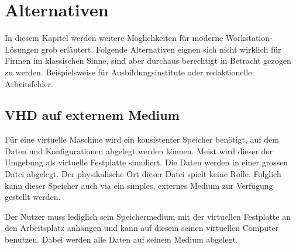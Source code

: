 




\section{Alternativen}
In diesem Kapitel werden weitere Möglichkeiten für moderne Workstation-Lösungen grob erläutert.
Folgende Alternativen eignen sich nicht wirklich für Firmen im klassischen Sinne, sind aber durchaus berechtigt in Betracht gezogen zu werden. Beispielsweise für Ausbildungsinstitute oder redaktionelle Arbeitsfelder.

\subsection{VHD auf externem Medium}
Für eine virtuelle Maschine wird ein konsistenter Speicher benötigt, auf dem Daten und Konfigurationen abgelegt werden können.
Meist wird dieser der Umgebung als virtuelle Festplatte simuliert. Die Daten werden in einer grossen Datei abgelegt. Der physikalische Ort dieser Datei spielt keine Rolle.
Folglich kann dieser Speicher auch via ein simples, externes Medium zur Verfügung gestellt werden.

Der Nutzer muss lediglich sein Speichermedium mit der virtuellen Festplatte an den Arbeitsplatz anhängen und kann auf diesem seinen virtuellen Computer benutzen.
Dabei werden alle Daten auf seinem Medium abgelegt.

